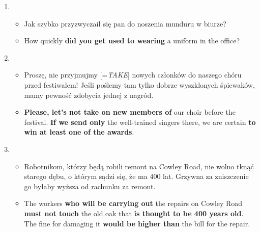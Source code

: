 \documentclass[a4paper]{article}
\begin{document}
\begin{enumerate}
    \item \begin{itemize}
        \item Jak szybko przyzwyczaił się pan do noszenia munduru w biurze?
        \item How quickly {\bf did you get used to wearing} a uniform in the office?
    \end{itemize}
    \item \begin{itemize}
        \item Proszę, nie przyjmujmy [=\emph{TAKE}] nowych członków do naszego chóru przed festiwalem! Jeśli poślemy tam tylko dobrze wyszklonych śpiewaków, mamy pewność zdobycia jednej z nagród.
        \item {\bf Please, let's not take on new members of} our choir before the festival. {\bf If we send only} the well-trained singers there, we are certain {\bf to win at least one of the awards}.
    \end{itemize}
    \item \begin{itemize}
        \item Robotnikom, którzy będą robili remont na Cowley Road, nie wolno tknąć starego dębu, o którym sądzi się, że ma 400 lat. Grzywna za zniszczenie go byłaby wyższa od rachunku za remont.
        \item The workers {\bf who will be carrying out} the repairs on Cowley Road {\bf must not touch} the old oak that {\bf is thought to be 400 years old}. The fine for damaging it {\bf would be higher than} the bill for the repair.
    \end{itemize}
\end{enumerate}
\end{document}
